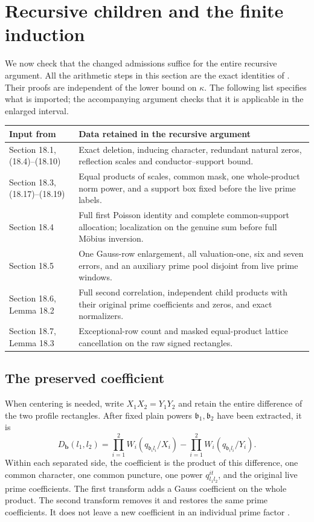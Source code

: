 \section{Recursive children and the finite induction}\label{adp:induction}

We now check that the changed admissions suffice for the entire
recursive argument. All the arithmetic steps in this section are
the exact identities of \cite[Sections 18.3--18.7]{OAI26}.
Their proofs are independent of the lower bound on $\kappa$.
The following list specifies what is imported; the accompanying
argument checks that it is applicable in the enlarged interval.

\begin{center}
\small
\begin{tabular}{@{}>{\raggedright\arraybackslash}p{.26\linewidth}
                  >{\raggedright\arraybackslash}p{.68\linewidth}@{}}
\toprule
Input from \cite{OAI26}&Data retained in the recursive argument\\
\midrule
Section 18.1, (18.4)--(18.10)&
Exact deletion, inducing character, redundant natural zeros,
reflection scales and conductor--support bound.\\
Section 18.3, (18.17)--(18.19)&
Equal products of scales, common mask, one whole-product norm
power, and a support box fixed before the live prime labels.\\
Section 18.4&
Full first Poisson identity and complete common-support allocation;
localization on the genuine sum before full M\"obius inversion.\\
Section 18.5&
One Gauss-row enlargement, all valuation-one, six and seven errors,
and an auxiliary prime pool disjoint from live prime windows.\\
Section 18.6, Lemma 18.2&
Full second correlation, independent child products with their
original prime coefficients and zeros, and exact normalizers.\\
Section 18.7, Lemma 18.3&
Exceptional-row count and masked equal-product lattice
cancellation on the raw signed rectangles.\\
\bottomrule
\end{tabular}
\end{center}

\subsection{The preserved coefficient}

When centering is needed, write $X_1X_2=Y_1Y_2$ and retain the
entire difference of the two profile rectangles. After fixed plain
powers $\mathfrak b_1,\mathfrak b_2$ have been extracted, it is
\[
 D_{\boldsymbol b}(l_1,l_2)=
 \prod_{i=1}^2W_i(q_{\mathfrak b_i l_i}/X_i)
 -\prod_{i=1}^2W_i(q_{\mathfrak b_i l_i}/Y_i).
\]
Within each separated side, the coefficient is the product of this
difference, one common character, one common puncture, one power
$q_{l_1l_2}^{it}$, and the original live prime coefficients.
The first transform adds a Gauss coefficient on the whole product.
The second transform removes it and restores the same prime
coefficients. It does not leave a new coefficient in an individual
prime factor \cite[Lemma 18.2]{OAI26}.

